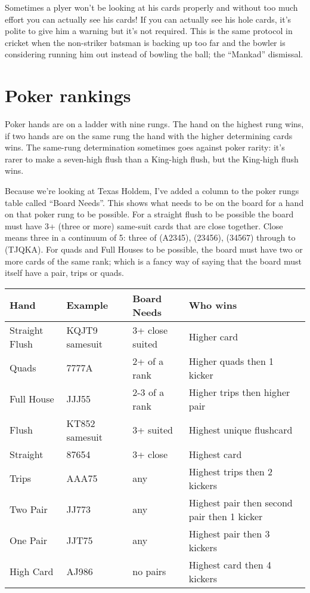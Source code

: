 Sometimes a plyer won't be looking at his cards properly and without
too much effort you can actually see his cards! If
you can actually see his hole cards, it's polite to give him a
warning but it's not required. This is the same protocol in cricket
when the non-striker batsman is backing up too far and the bowler is
considering running him out instead of bowling the ball; the
``Mankad'' dismissal.

\section{Poker rankings}

Poker hands are on a ladder with nine rungs. The hand on
the highest rung wins, if two hands are on the same rung the hand with
the higher determining cards wins. The same-rung determination
sometimes goes against poker rarity: it's rarer to make a seven-high
flush than a King-high flush, but the King-high flush wins.

Because we're looking at Texas Holdem, I've added a column to the
poker rungs table called ``Board Needs''. This shows what needs to be
on the board for a hand on that poker rung to be possible. For a
straight flush to be possible the board must have 3+ (three or more)
same-suit cards that are close together. Close means three in a
continuum of 5: three of (A2345), (23456), (34567) through to
(TJQKA). For quads and Full Houses to be possible, the board must have
two or more cards of the same rank; which is a fancy way of saying
that the board must itself have a pair, trips or quads.


\begin{tabular}{|l|l|l|l|} \hline
Hand            & Example   & Board Needs    & Who wins \\ \hline
Straight Flush  & KQJT9 samesuit     & 3+ close suited &
Higher card \\ \hline
Quads           & 7777A     & 2+ of a rank   & Higher quads then
1 kicker \\ \hline
Full House      & JJJ55     & 2-3 of a rank  & Higher trips then
higher pair \\ \hline
Flush           & KT852 samesuit & 3+ suited & Highest unique flushcard
\\ \hline
Straight        & 87654     & 3+ close       & Highest card \\ \hline
Trips           & AAA75     & any            & Highest trips then 2
kickers \\ \hline
Two Pair        & JJ773     & any            & Highest pair then
second pair then 1 kicker \\ \hline
One Pair        & JJT75     & any            & Highest pair then 3
kickers \\ \hline
High Card       & AJ986     & no pairs       & Highest card then 4
kickers \\ \hline
\end{tabular}

